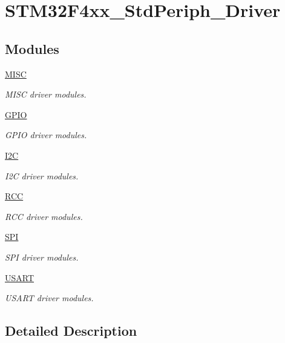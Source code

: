 \hypertarget{group___s_t_m32_f4xx___std_periph___driver}{}\section{S\+T\+M32\+F4xx\+\_\+\+Std\+Periph\+\_\+\+Driver}
\label{group___s_t_m32_f4xx___std_periph___driver}
\subsection*{Modules}
\begin{DoxyCompactItemize}
\item 
\mbox{\hyperlink{group___m_i_s_c}{M\+I\+SC}}
\begin{DoxyCompactList}\small\item\em M\+I\+SC driver modules. \end{DoxyCompactList}\item 
\mbox{\hyperlink{group___g_p_i_o}{G\+P\+IO}}
\begin{DoxyCompactList}\small\item\em G\+P\+IO driver modules. \end{DoxyCompactList}\item 
\mbox{\hyperlink{group___i2_c}{I2C}}
\begin{DoxyCompactList}\small\item\em I2C driver modules. \end{DoxyCompactList}\item 
\mbox{\hyperlink{group___r_c_c}{R\+CC}}
\begin{DoxyCompactList}\small\item\em R\+CC driver modules. \end{DoxyCompactList}\item 
\mbox{\hyperlink{group___s_p_i}{S\+PI}}
\begin{DoxyCompactList}\small\item\em S\+PI driver modules. \end{DoxyCompactList}\item 
\mbox{\hyperlink{group___u_s_a_r_t}{U\+S\+A\+RT}}
\begin{DoxyCompactList}\small\item\em U\+S\+A\+RT driver modules. \end{DoxyCompactList}\end{DoxyCompactItemize}


\subsection{Detailed Description}
